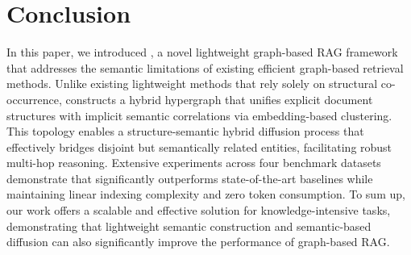 \section{Conclusion}
\label{sec:conclusion}

In this paper, we introduced \textbf{\EHGRAG}, a novel lightweight graph-based RAG framework that addresses the semantic limitations of existing efficient graph-based retrieval methods. Unlike existing lightweight methods that rely solely on structural co-occurrence, \EHGRAG constructs a hybrid hypergraph that unifies explicit document structures with implicit semantic correlations via embedding-based clustering. This topology enables a structure-semantic hybrid diffusion process that effectively bridges disjoint but semantically related entities, facilitating robust multi-hop reasoning. Extensive experiments across four benchmark datasets demonstrate that \EHGRAG significantly outperforms state-of-the-art baselines while maintaining linear indexing complexity and zero token consumption. To sum up, our work offers a scalable and effective solution for knowledge-intensive tasks, demonstrating that lightweight semantic construction and semantic-based diffusion can also significantly improve the performance of graph-based RAG.
